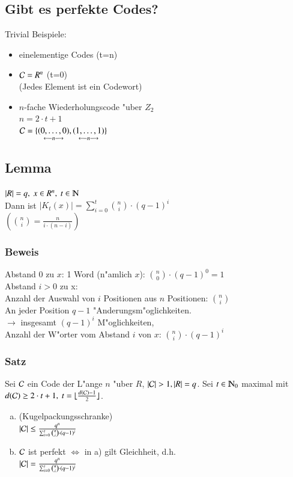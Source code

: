 \subsection{Gibt es perfekte Codes?}
Trivial Beispiele:
\begin{itemize}
	\item einelementige Codes (t=n)
	\item $\mathcal{C} = R^n$ (t=0) \\
				(Jedes Element ist ein Codewort)
	\item $n$-fache Wiederholungscode "uber $Z_2$ \\
				$n=2 \cdot t +1$ \\
				$\mathcal{C} = \lbrace \underset{\longleftarrow n \longrightarrow}{(0,\ldots,0)},\underset{\longleftarrow n \longrightarrow}{(1,\ldots,1)}\rbrace$
\end{itemize}

\subsection{Lemma}
$\left| R \right| = q,\ x \in R^n,\ t \in \N$ \\
Dann ist $\left| K_t(x) \right| = \sum_{i=0}^t \binom{n}{i} \cdot (q-1)^i$ \\
$\left(\binom{n}{i}=\frac{n\!}{i\! \cdot (n-i)\!}\right)$

\subsubsection{Beweis}
Abstand 0 zu $x$: 1 Word (n"amlich $x$): $\binom{n}{0} \cdot (q-1)^0 =1$ \\
Abstand $i>0$ zu x: \\
Anzahl der Auswahl von $i$ Positionen aus $n$ Positionen: $\binom{n}{i}$ \\
An jeder Position $q-1$ "Anderungsm"oglichkeiten. \\
$\rightarrow$ insgesamt $(q-1)^i$ M"oglichkeiten, \\
Anzahl der W"orter vom Abstand $i$ von $x$: $\binom{n}{i} \cdot (q-1)^i$

\subsubsection{Satz}
Sei $\mathcal{C}$ ein Code der L"ange $n$ "uber $R$, $\left| \Code \right|> 1, \left|R\right| = q$. Sei $t \in \N_0$ maximal mit $d(\mathcal{C}) \geq 2 \cdot t + 1,\ t=\lfloor \frac{d(\mathcal{C})-1}{2}\rfloor$.
\begin{enumerate}[a)]
	\item (Kugelpackungsschranke) \\
	$\left|\mathcal{C}\right| \leq \frac{q^n}{\sum_{i=0}^t \binom{n}{i} \cdot (q-1)^i}$
	\item $\mathcal{C}$ ist perfekt $\Leftrightarrow$ in a) gilt Gleichheit, d.h. \\
	$\left|\mathcal{C}\right| = \frac{q^n}{\sum_{i=0}^t \binom{n}{i} \cdot (q-1)^i}$
\end{enumerate}

